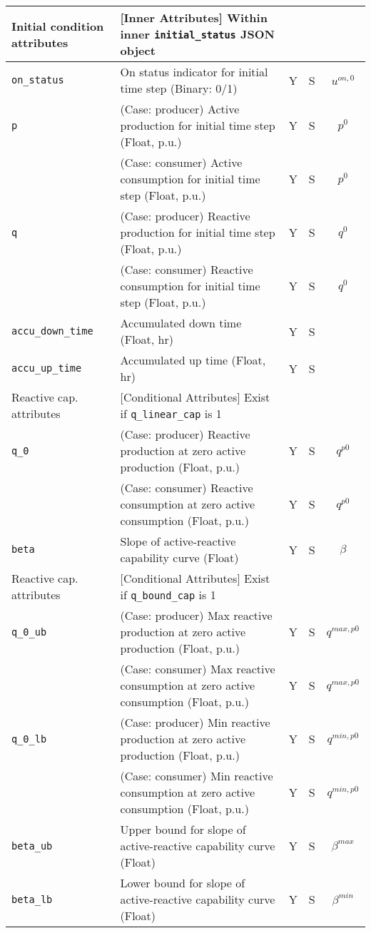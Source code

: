 \documentclass{article}
\begin{document}
\begin{center}
\small
\begin{tabular}{ l | l | c | c | c |}
  Initial condition attributes &  [Inner Attributes] Within inner {\tt initial\_status} JSON object &  &  & \\
  \hline
  {\tt on\_status} & On status indicator for initial time step (Binary: 0/1) & Y & S & $u^{on,0}$\\
  {\tt p} & { (Case: producer) Active production for initial time step (Float, p.u.) }& Y & S & $p^0$ \\
          & { (Case: consumer) Active consumption for initial time step (Float, p.u.) }& Y & S & $p^0$ \\
  {\tt q} & { (Case: producer) Reactive production for initial time step (Float, p.u.) }& Y & S & $q^0$ \\
          & { (Case: consumer) Reactive consumption for initial time step (Float, p.u.) }& Y & S & $q^0$ \\
  {\tt accu\_down\_time} & Accumulated down time (Float, hr) & Y & S & \\
  {\tt accu\_up\_time} & Accumulated up time (Float, hr) & Y & S & \\
 \hline
 \hline
  Reactive cap. attributes & [Conditional Attributes] Exist if {\tt q\_linear\_cap} is 1 &  &  & \\
  \hline
  {\tt q\_0}               & { (Case: producer) Reactive production at zero active production (Float, p.u.) }& Y & S & $q^{p0}$\\
                           & { (Case: consumer) Reactive consumption at zero active consumption (Float, p.u.) }& Y & S & $q^{p0}$\\
  {\tt beta}          & Slope of active-reactive capability curve (Float) & Y & S & $\beta$\\
  \hline
  Reactive cap. attributes & [Conditional Attributes] Exist if {\tt q\_bound\_cap} is 1 &  &  & \\
  \hline
  {\tt q\_0\_ub}           & { (Case: producer) Max reactive production at zero active production (Float, p.u.)} & Y & S & $q^{max,p0}$\\
                           & { (Case: consumer) Max reactive consumption at zero active consumption (Float, p.u.)} & Y & S & $q^{max,p0}$\\
  {\tt q\_0\_lb}           & { (Case: producer) Min reactive production at zero active production (Float, p.u.)} & Y & S & $q^{min,p0}$\\
                           & { (Case: consumer) Min reactive consumption at zero active consumption (Float, p.u.)} & Y & S & $q^{min,p0}$\\
  {\tt beta\_ub}      & Upper bound for slope of active-reactive capability curve (Float) & Y & S & $\beta^{max}$\\
  {\tt beta\_lb}      & Lower bound for slope of active-reactive capability curve (Float) & Y & S & $\beta^{min}$\\
  \hline
  
\end{tabular}
\end{center}
\end{document}
